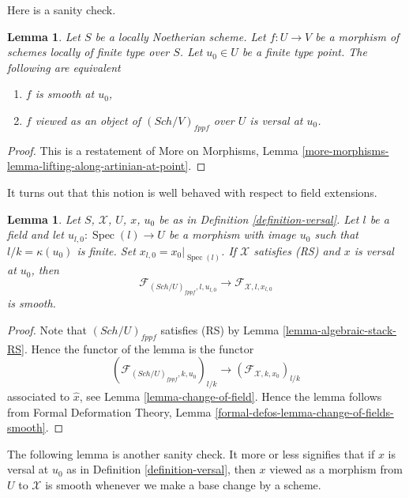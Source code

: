 \documentclass{stacks-project}
\theoremstyle{plain}
\newtheorem{lemma}[subsection]{Lemma}
\theoremstyle{definition}
\theoremstyle{remark}
\numberwithin{equation}{subsection}
\def\Spec{\mathop{\mathrm{Spec}}}
\def\Sch{\mathit{Sch}}
\begin{document}
\noindent
Here is a sanity check.

\begin{lemma}
\label{lemma-versal-implies-smooth}
Let $S$ be a locally Noetherian scheme. Let $f : U \to V$
be a morphism of schemes locally of finite type over $S$.
Let $u_0 \in U$ be a finite type point. The following are equivalent
\begin{enumerate}
\item $f$ is smooth at $u_0$,
\item $f$ viewed as an object of $(\Sch/V)_{fppf}$ over $U$ is
versal at $u_0$.
\end{enumerate}
\end{lemma}

\begin{proof}
This is a restatement of More on Morphisms, Lemma
\ref{more-morphisms-lemma-lifting-along-artinian-at-point}.
\end{proof}

\noindent
It turns out that this notion is well behaved with respect to field
extensions.

\begin{lemma}
\label{lemma-versal-change-of-field}
Let $S$, $\mathcal{X}$, $U$, $x$, $u_0$ be as in
Definition \ref{definition-versal}. Let $l$ be a field and let
$u_{l, 0} : \Spec(l) \to U$ be a morphism with image $u_0$ such that
$l/k = \kappa(u_0)$ is finite. Set $x_{l, 0} = x_0|_{\Spec(l)}$.
If $\mathcal{X}$ satisfies (RS) and $x$ is versal at $u_0$, then
$$
\mathcal{F}_{(\Sch/U)_{fppf}, l, u_{l, 0}}
\longrightarrow
\mathcal{F}_{\mathcal{X}, l, x_{l, 0}}
$$
is smooth.
\end{lemma}

\begin{proof}
Note that $(\Sch/U)_{fppf}$ satisfies (RS) by
Lemma \ref{lemma-algebraic-stack-RS}.
Hence the functor of the lemma is the functor
$$
(\mathcal{F}_{(\Sch/U)_{fppf}, k , u_0})_{l/k}
\longrightarrow
(\mathcal{F}_{\mathcal{X}, k , x_0})_{l/k}
$$
associated to $\hat x$, see Lemma \ref{lemma-change-of-field}.
Hence the lemma follows from
Formal Deformation Theory, Lemma
\ref{formal-defos-lemma-change-of-fields-smooth}.
\end{proof}

\noindent
The following lemma is another sanity check. It more or less
signifies that if $x$ is versal at $u_0$ as in
Definition \ref{definition-versal},
then $x$ viewed as a morphism from $U$ to $\mathcal{X}$ is
smooth whenever we make a base change by a scheme.
\end{document}

